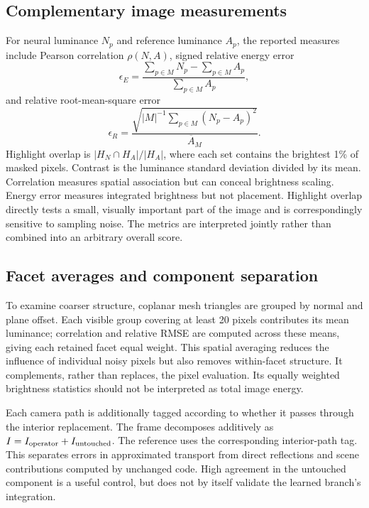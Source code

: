\documentclass[conference]{IEEEtran}
\begin{document}
\subsection{Complementary image measurements}
For neural luminance $N_p$ and reference luminance $A_p$, the reported measures
include Pearson correlation $\rho(N,A)$, signed relative energy error
\begin{equation}
 \epsilon_E=\frac{\sum_{p\in M}N_p-\sum_{p\in M}A_p}
 {\sum_{p\in M}A_p},
\end{equation}
and relative root-mean-square error
\begin{equation}
 \epsilon_R=\frac{\sqrt{|M|^{-1}\sum_{p\in M}(N_p-A_p)^2}}
 {\overline A_M}.
\end{equation}
Highlight overlap is $|H_N\cap H_A|/|H_A|$, where each set contains the
brightest 1\% of masked pixels. Contrast is the luminance standard deviation
divided by its mean. Correlation measures spatial association but can conceal
brightness scaling. Energy error measures integrated brightness but not
placement. Highlight overlap directly tests a small, visually important part of
the image and is correspondingly sensitive to sampling noise. The metrics are
interpreted jointly rather than combined into an arbitrary overall score.

\subsection{Facet averages and component separation}
\label{sec:facets}
To examine coarser structure, coplanar mesh triangles are grouped by normal and
plane offset. Each visible group covering at least 20 pixels contributes its
mean luminance; correlation and relative RMSE are computed across these means,
giving each retained facet equal weight. This spatial averaging reduces the
influence of individual noisy pixels but also removes within-facet structure.
It complements, rather than replaces, the pixel evaluation. Its equally
weighted brightness statistics should not be interpreted as total image energy.

Each camera path is additionally tagged according to whether it passes through
the interior replacement. The frame decomposes additively as
$I=I_{\rm operator}+I_{\rm untouched}$. The reference uses the corresponding
interior-path tag. This separates errors in approximated transport from direct
reflections and scene contributions computed by unchanged code. High agreement
in the untouched component is a useful control, but does not by itself validate
the learned branch's integration.
\end{document}
